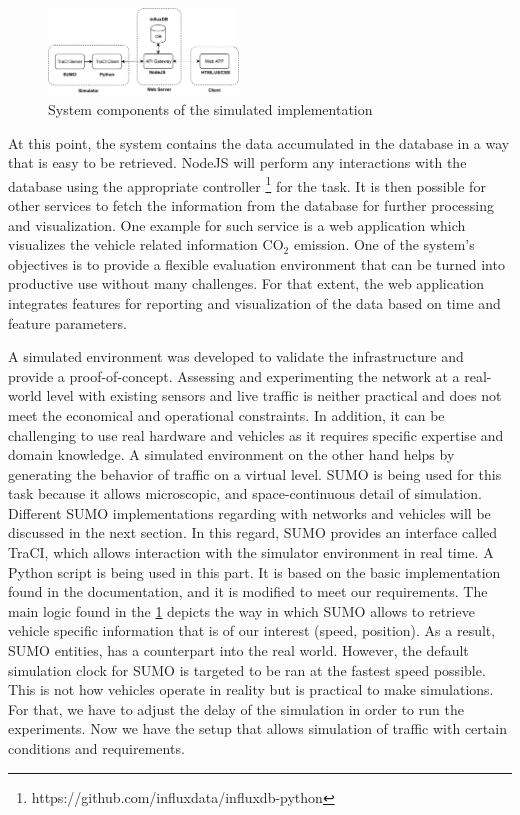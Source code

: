 \documentclass[letter, 10pt, conference]{ieeeconf}
\begin{document}
\begin{figure}[h]
  \centering
  \includegraphics[width=0.45\textwidth]{diagram2}
  \caption{System components of the simulated implementation}
  \label{fig:diagram2}
\end{figure}

At this point, the system contains the data accumulated in the database in a way that is easy to be retrieved.
NodeJS will perform any interactions with the database using the appropriate controller \footnote{https://github.com/influxdata/influxdb-python} for the task.
It is then possible for other services to fetch the information from the database for further processing and visualization.
One example for such service is a web application which visualizes the vehicle related information CO$_2$ emission.
One of the system's objectives is to provide a flexible evaluation environment that can be turned into productive use without many challenges.
For that extent, the web application integrates features for reporting and visualization of the data based on time and feature parameters.

A simulated environment was developed to validate the infrastructure and provide a proof-of-concept.
Assessing and experimenting the network at a real-world level with existing sensors and live traffic is neither practical and does not meet the economical and operational constraints.
In addition, it can be challenging to use real hardware and vehicles as it requires specific expertise and domain knowledge.
A simulated environment on the other hand helps by generating the behavior of traffic on a virtual level.
SUMO is being used for this task because it allows microscopic, and space-continuous detail of simulation.
Different SUMO implementations regarding with networks and vehicles will be discussed in the next section.
In this regard, SUMO provides an interface called TraCI, which allows interaction with the simulator environment in real time.
A Python script is being used in this part.
It is based on the basic implementation found in the documentation, and it is modified to meet our requirements.
The main logic found in the \ref{fig:diagram2} depicts the way in which SUMO allows to retrieve vehicle specific information that is of our interest (speed, position).
As a result, SUMO entities, has a counterpart into the real world.
However, the default simulation clock for SUMO is targeted to be ran at the fastest speed possible.
This is not how vehicles operate in reality but is practical to make simulations.
For that, we have to adjust the delay of the simulation in order to run the experiments.
Now we have the setup that allows simulation of traffic with certain conditions and requirements.
\end{document}

